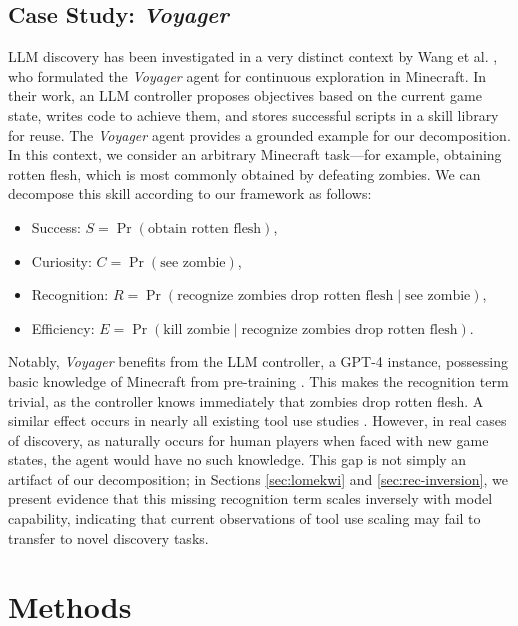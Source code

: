\documentclass{article}
\begin{document}
\subsection{Case Study: \textit{Voyager}}
\label{subsec:example}

LLM discovery has been investigated in a very distinct context by Wang et al. \citep{wang2024voyager}, who formulated the \textit{Voyager} agent for continuous exploration in Minecraft. In their work, an LLM controller proposes objectives based on the current game state, writes code to achieve them, and stores successful scripts in a skill library for reuse. The \textit{Voyager} agent provides a grounded example for our decomposition. In this context, we consider an arbitrary Minecraft task---for example, obtaining rotten flesh, which is most commonly obtained by defeating zombies. We can decompose this skill according to our framework as follows: 

\begin{itemize}
    \item Success: $S=\Pr(\text{obtain rotten flesh})$,
    \item Curiosity: $C=\Pr(\text{see zombie})$,
    \item Recognition: $R=\Pr(\text{recognize zombies drop rotten flesh}\mid\text{see zombie})$,
    \item Efficiency: $E=\Pr(\text{kill zombie}\mid\text{recognize zombies drop rotten flesh})$.
\end{itemize}

Notably, \textit{Voyager} benefits from the LLM controller, a GPT-4 instance, possessing basic knowledge of Minecraft from pre-training \citep{wang2024voyager}. This makes the recognition term trivial, as the controller knows immediately that zombies drop rotten flesh. A similar effect occurs in nearly all existing tool use studies \citep{patil2024gorilla,qin2024toolllm,huang2024ultratool,yu2026wildtoolbench}. However, in real cases of discovery, as naturally occurs for human players when faced with new game states, the agent would have no such knowledge. This gap is not simply an artifact of our decomposition; in Sections \ref{sec:lomekwi} and \ref{sec:rec-inversion}, we present evidence that this missing recognition term scales inversely with model capability, indicating that current observations of tool use scaling may fail to transfer to novel discovery tasks.

\section{Methods}
\label{sec:setup}
\end{document}
